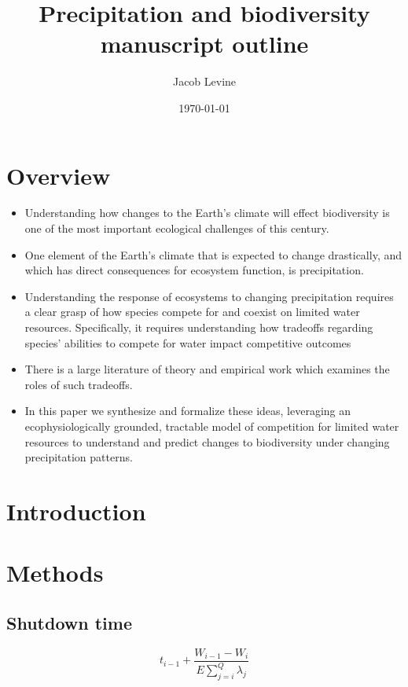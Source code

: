 \documentclass[11pt]{article}
\author{Jacob Levine}
\date{\today}
\title{Precipitation and biodiversity manuscript outline}
\begin{document}
\maketitle
\tableofcontents


\section{Overview}
\label{sec:orgb5eefdc}

\begin{itemize}
\item Understanding how changes to the Earth's climate will effect biodiversity is one of the most important ecological challenges of this century.
\item One element of the Earth's climate that is expected to change drastically, and which has direct consequences for ecosystem function, is precipitation.
\item Understanding the response of ecosystems to changing precipitation requires a clear grasp of how species compete for and coexist on limited water resources. Specifically, it requires understanding how tradeoffs regarding species' abilities to compete for water impact competitive outcomes
\item There is a large literature of theory and empirical work which examines the roles of such tradeoffs.
\item In this paper we synthesize and formalize these ideas, leveraging an ecophysiologically grounded, tractable model of competition for limited water resources to understand and predict changes to biodiversity under changing precipitation patterns.
\end{itemize}

\section{Introduction}
\label{sec:org58e705d}

\section{Methods}
\label{sec:orgb3b9295}

\subsection{Shutdown time}
\label{sec:org040be70}

\begin{equation}
   t_{i-1} + \frac{W_{i-1} - W_i}{E \sum_{j=i}^Q\lambda_{j}}
\end{equation}
\end{document}
